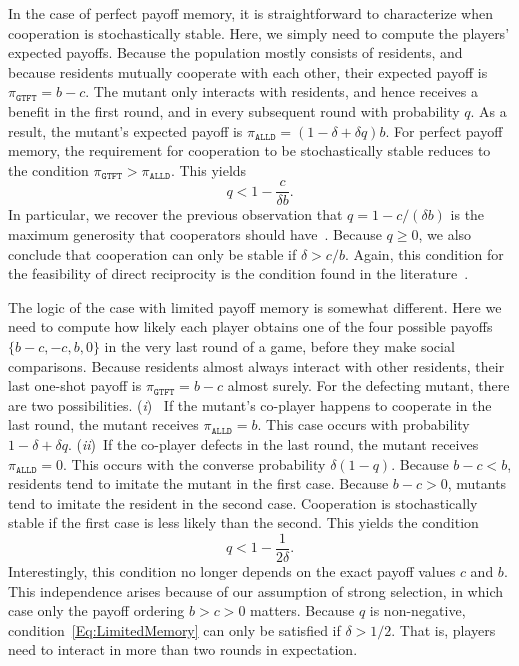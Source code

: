 \documentclass[11pt]{article}
\def\alld{\texttt{ALLD}}
\def\gtft{\texttt{GTFT}}
\theoremstyle{plainCl1}
\theoremstyle{plainCl2}
\begin{document}
In the case of perfect payoff memory, it is straightforward to characterize when cooperation is stochastically stable. 
Here, we simply need to compute the players' expected payoffs. 
Because the population mostly consists of residents, and because residents mutually cooperate with each other, their expected payoff is $\pi_\gtft = b\!-\!c$. 
The mutant only interacts with residents, and hence receives a benefit in the first round, and in every subsequent round with probability $q$. 
As a result, the mutant's expected payoff is $\pi_\alld \!=\! (1\!-\!\delta\!+\!\delta q)b$. 
For perfect payoff memory, the requirement for cooperation to be stochastically stable reduces to the condition $\pi_\gtft > \pi_\alld$. 
This yields
\begin{equation} \label{Eq:PerfectMemory}
q < 1\!-\!\frac{c}{\delta  b}.
\end{equation}
In particular, we recover the previous observation that $q\!=\!1-c/(\delta b)$ is the maximum generosity that cooperators should have~\citep{molander:jcr:1985,Nowak1992tit,Schmid:NHB:2021}. 
Because $q\!\ge\!0$, we also conclude that cooperation can only be stable if $\delta \!>\! c/b$.
Again, this condition for the feasibility of direct reciprocity is the condition found in the literature~\citep{nowak:Science:2006}.


The logic of the case with limited payoff memory is somewhat different. 
Here we need to compute how likely each player obtains one of the four possible payoffs $\{b\!-\!c, -c, b, 0\}$ in the very last round of a game, before they make social comparisons.
Because residents almost always interact with other residents, their last one-shot payoff is $\pi_\gtft = b\!-\!c$ almost surely. 
For the defecting mutant, there are two possibilities. 
({\it i})~ If the mutant's co-player happens to cooperate in the last round, the mutant receives $\pi_\alld\!=\!b$.
This case occurs with probability $1\!-\!\delta\!+\!\delta q$. 
({\it ii})~If the co-player defects in the last round, the mutant receives $\pi_\alld=\!0$. 
This occurs with the converse probability $\delta(1\!-\!q)$.
Because $b\!-\!c\!<\!b$, residents tend to imitate the mutant in the first case. 
Because $b\!-\!c\!>\!0$, mutants tend to imitate the resident in the second case. 
Cooperation is stochastically stable if the first case is less likely than the second. 
This yields the condition
\begin{equation} \label{Eq:LimitedMemory}
q < 1\!-\!\frac{1}{2 \delta}.
\end{equation}
Interestingly, this condition no longer depends on the exact payoff values $c$ and $b$. 
This independence arises because of our assumption of strong selection, in which case only the payoff ordering $b\!>\!c\!>\!0$ matters. Because $q$ is non-negative, condition~\eqref{Eq:LimitedMemory} can only be satisfied if $\delta\!>\!1/2$. That is, players need to interact in more than two rounds in expectation. 
\end{document}
